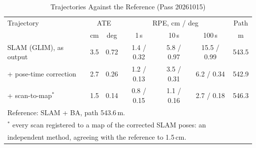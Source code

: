 \begin{table}[!t]
\centering
\caption{Trajectories Against the Reference (Pass 20261015)}
\label{tab:glim_vs_ref}
\footnotesize
\setlength{\tabcolsep}{2.5pt}
\begin{tabular}{lcccccc}
\toprule
Trajectory & \multicolumn{2}{c}{ATE} & \multicolumn{3}{c}{RPE, cm / deg} & Path \\
 & cm & deg & 1\,s & 10\,s & 100\,s & m \\
\midrule
SLAM (GLIM), as output      & 3.5 & 0.72 & 1.4 / 0.32 & 5.8 / 0.97 & 15.5 / 0.99 & 543.5 \\
+ pose-time correction      & 2.7 & 0.26 & 1.2 / 0.13 & 3.5 / 0.31 & 6.2 / 0.34  & 542.9 \\
+ scan-to-map$^\ast$        & 1.5 & 0.14 & 0.8 / 0.15 & 1.1 / 0.16 & 2.7 / 0.18  & 546.3 \\
\bottomrule
\multicolumn{7}{l}{Reference: SLAM + BA, path 543.6\,m.}\\
\multicolumn{7}{l}{$^\ast$ every scan registered to a map of the corrected SLAM poses: an}\\
\multicolumn{7}{l}{\phantom{$^\ast$} independent method, agreeing with the reference to 1.5\,cm.}
\end{tabular}
\end{table}
